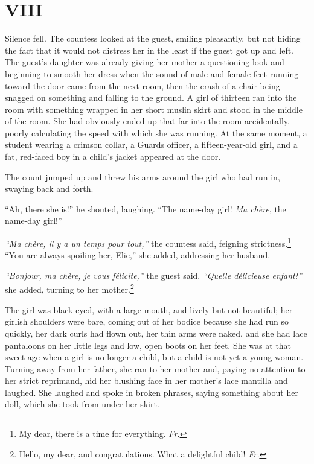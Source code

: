 \section*{VIII} %

Silence fell. The countess looked at the guest, smiling pleasantly, but not hiding the fact that it would not distress her in the least if the guest got up and left. The guest's daughter was already giving her mother a questioning look and beginning to smooth her dress when the sound of male and female feet running toward the door came from the next room, then the crash of a chair being snagged on something and falling to the ground. A girl of thirteen ran into the room with something wrapped in her short muslin skirt and stood in the middle of the room. She had obviously ended up that far into the room accidentally, poorly calculating the speed with which she was running. At the same moment, a student wearing a crimson collar, a Guards officer, a fifteen-year-old girl, and a fat, red-faced boy in a child's jacket appeared at the door.

The count jumped up and threw his arms around the girl who had run in, swaying back and forth.

``Ah, there she is!'' he shouted, laughing. ``The name-day girl! \textit{Ma ch\`ere}, the name-day girl!'' %

\textit{``Ma ch\`ere, il y a un temps pour tout,''} the countess said, feigning strictness.\footnote{My dear, there is a time for everything. \textit{Fr.}} ``You are always spoiling her, Elie,'' she added, addressing her husband. %

\textit{``Bonjour, ma ch\`ere, je vous f\'elicite,''} the guest said. \textit{``Quelle d\'elicieuse enfant!''} she added, turning to her mother.\footnote{Hello, my dear, and congratulations. What a delightful child! \textit{Fr.}}

The girl was black-eyed, with a large mouth, and lively but not beautiful; her girlish shoulders were bare, coming out of her bodice because she had run so quickly, her dark curls had flown out, her thin arms were naked, and she had lace pantaloons on her little legs and low, open boots on her feet. She was at that sweet age when a girl is no longer a child, but a child is not yet a young woman. Turning away from her father, she ran to her mother and, paying no attention to her strict reprimand, hid her blushing face in her mother's lace mantilla and laughed. She laughed and spoke in broken phrases, saying something about her doll, which she took from under her skirt.

